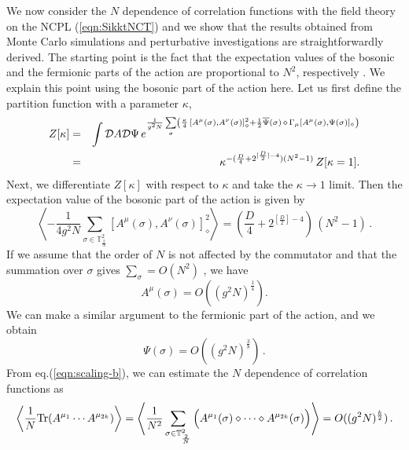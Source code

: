 \documentclass[12pt,a4paper]{article}
\newcommand{\ncpl}{{\mathbb T}^2_\frac{2}{N}}
\newcommand{\Tr}{\mbox{\rm Tr}}
\begin{document}
We now consider the $N$ dependence of correlation functions with the
field theory on the NCPL (\ref{eqn:SikktNCT}) and we show that
the results obtained from Monte Carlo simulations
\cite{MCsimu,AABHN,alpha} and perturbative investigations
\cite{MCsimu} are straightforwardly derived.
The starting point is the fact that the expectation values of the
bosonic and the fermionic parts of the action are proportional to
$N^2$, respectively \cite{MCsimu}.
We explain this point using the bosonic part of the action here.
Let us first define the partition function with a parameter $\kappa$,
\begin{eqnarray}
  Z[\kappa]&=&\int {\cal D}A{\cal D}\Psi\,
	e^{\frac{1}{g^2N}\sum\limits_\sigma
	\left(\frac{\kappa}{4}\,
	[A^\mu(\sigma),A^\nu(\sigma)]^2_\diamond
	+ \frac{1}{2}{\overline\Psi(\sigma)}\,\diamond\,\Gamma_\mu
	[A^\mu(\sigma),\Psi(\sigma)]_\diamond \right)}\nonumber\\
   &=&\kappa^{-(\frac{D}{4}+ 2^{[\frac{D}{2}]-4}) (N^2-1)}
	\,Z[\kappa=1].\label{eqn:Z-kappa}
\end{eqnarray}
Next, we differentiate $Z[\kappa]$ with respect to $\kappa$ and take
the $\kappa\rightarrow1$ limit. Then the expectation value of the
bosonic part of the action is given by
\begin{equation}
    \left\langle -\frac{1}{4g^2N}
	\sum_{\sigma\in \ncpl}
	[A^\mu(\sigma),A^\nu(\sigma)]^2_\diamond\right\rangle
    = \left(\frac{D}{4}+2^{[\frac{D}{2}]-4}\right)\,(N^2-1)\,.
	\label{eqn:com-dist}
\end{equation}
If we assume that the order of $N$ is not affected by
the commutator and that the summation over $\sigma$ gives
$\sum\limits_{\sigma} = O(N^2)$ \cite{KU}, we have
\begin{equation}
    A^\mu(\sigma) = O((g^2N)^{\frac{1}{4}}).\label{eqn:scaling-b}
\end{equation}
We can make a similar argument to the fermionic part of the action,
and we obtain
\begin{equation}
  \Psi(\sigma) = O((g^2N)^{\frac{3}{8}})\,.\label{eqn:scaling-f}
\end{equation}
{}From eq.(\ref{eqn:scaling-b}), we can estimate the $N$ dependence of
correlation functions as
\begin{equation}
  \left\langle {\frac{1}{N}}\Tr (A^{\mu_1}\cdots A^{\mu_{2k}})
	\right\rangle
  =\left\langle{\frac{1}{N^2}}
	\sum_{\sigma\in \ncpl} \Big(A^{\mu_1}(\sigma)
	\diamond\cdots\diamond A^{\mu_{2k}}(\sigma)\Big)\right\rangle
	=  O((g^2 N)^{\frac{k}{2}})\,.\label{eqn:predictA}
\end{equation}
\end{document}
